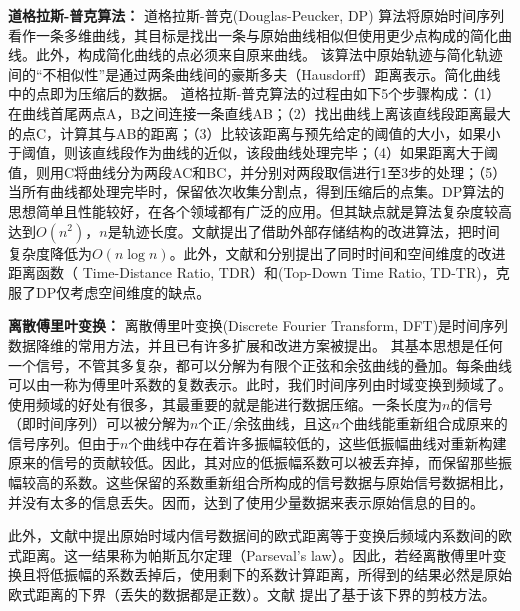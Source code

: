 \textbf{道格拉斯-普克算法：}
道格拉斯-普克(Douglas-Peucker, DP) 算法将原始时间序列看作一条多维曲线，其目标是找出一条与原始曲线相似但使用更少点构成的简化曲线。此外，构成简化曲线的点必须来自原来曲线。
该算法中原始轨迹与简化轨迹间的“不相似性”是通过两条曲线间的豪斯多夫（Hausdorff）距离表示。简化曲线中的点即为压缩后的数据。
道格拉斯-普克算法的过程由如下5个步骤构成：（1）在曲线首尾两点A，B之间连接一条直线AB；（2）找出曲线上离该直线段距离最大的点C，计算其与AB的距离；（3）比较该距离与预先给定的阈值的大小，如果小于阈值，则该直线段作为曲线的近似，该段曲线处理完毕；（4）如果距离大于阈值，则用C将曲线分为两段AC和BC，并分别对两段取信进行1至3步的处理；（5）当所有曲线都处理完毕时，保留依次收集分割点，得到压缩后的点集。DP算法的思想简单且性能较好，在各个领域都有广泛的应用。但其缺点就是算法复杂度较高达到$O(n^2)$，$n$是轨迹长度。文献\cite{DPSpeeding}提出了借助外部存储结构的改进算法，把时间复杂度降低为$O(n\log n)$。此外，文献\cite{MeratniaB04}和\cite{LiuZSSKJ15}分别提出了同时时间和空间维度的改进距离函数（ Time-Distance Ratio, TDR）和(Top-Down Time Ratio, TD-TR)，克服了DP仅考虑空间维度的缺点。

\textbf{离散傅里叶变换：}
离散傅里叶变换(Discrete Fourier Transform, DFT)\cite{DFT}是时间序列数据降维的常用方法，并且已有许多扩展和改进方案被提出\cite{fastDFT,rafiei1997similarity,rafiei1999on}。
其基本思想是任何一个信号，不管其多复杂，都可以分解为有限个正弦和余弦曲线的叠加。每条曲线可以由一称为傅里叶系数的复数表示\cite{Shatkay1995The}。此时，我们时间序列由时域变换到频域了。使用频域的好处有很多，其最重要的就是能进行数据压缩。一条长度为$n$的信号（即时间序列）可以被分解为$n$个正/余弦曲线，且这$n$个曲线能重新组合成原来的信号序列。但由于$n$个曲线中存在着许多振幅较低的，这些低振幅曲线对重新构建原来的信号的贡献较低。因此，其对应的低振幅系数可以被丢弃掉，而保留那些振幅较高的系数。这些保留的系数重新组合所构成的信号数据与原始信号数据相比，并没有太多的信息丢失。因而，达到了使用少量数据来表示原始信息的目的。

此外，文献\cite{Shatkay1995The}中提出原始时域内信号数据间的欧式距离等于变换后频域内系数间的欧式距离。这一结果称为帕斯瓦尔定理（Parseval's law）。因此，若经离散傅里叶变换且将低振幅的系数丢掉后，使用剩下的系数计算距离，所得到的结果必然是原始欧式距离的下界（丢失的数据都是正数）。文献 \cite{KeoghDimReduction}提出了基于该下界的剪枝方法。

